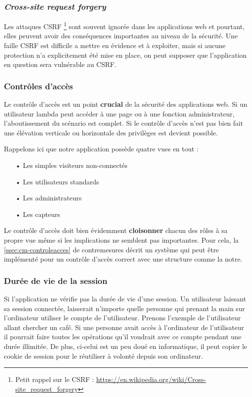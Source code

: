 \documentclass[12pt]{article}
\begin{document}
\subsubsection{\emph{Cross-site request forgery}}

Les attaques CSRF \footnote{Petit rappel sur le CSRF : \url{https://en.wikipedia.org/wiki/Cross-site_request_forgery}} sont souvent ignorée dans les applications web et pourtant, elles peuvent avoir des conséquences importantes au niveau de la sécurité. Une faille CSRF est difficile a
mettre en évidence et à exploiter, mais si aucune protection n'a explicitement été mise en place, on peut supposer que l'application en question sera vulnérable au CSRF.

\subsubsection{Contrôles d'accès}

Le contrôle d'accès est un point \textbf{crucial} de la sécurité des applications web. Si un utilisateur lambda peut accéder à une page ou à une fonction administrateur, l'aboutissement du scénario est complet. Si le contrôle d'accès n'est pas bien fait une élévation verticale ou horizontale des privilèges est devient possible. 

Rappelons ici que notre application possède quatre vues en tout :

\begin{itemize}
\item[•] Les simples visiteurs non-connectés
\item[•] Les utilisateurs standards
\item[•] Les administrateurs
\item[•] Les capteurs
\end{itemize}

Le contrôle d'accès doit bien évidemment \textbf{cloisonner} chacun des rôles à sa propre vue même si les implications ne semblent pas importantes. Pour cela, la \autoref{ssec:cm-controleacces} de contremesures décrit un système qui peut être implémenté pour un contrôle d'accès correct avec une structure comme la notre.

\subsubsection{Durée de vie de la session}

Si l'application ne vérifie pas la durée de vie d'une session. Un utilisateur laissant sa session connectée, laisserait n'importe quelle personne qui prenant la main sur l'ordinateur utiliser le compte de l'utilisateur.
Prenons l'exemple de l'utilisateur allant chercher un café. Si une personne avait accès à l'ordinateur de l'utilisateur il pourrait faire toutes les opérations qu'il voudrait avec ce compte pendant une durée illimitée. De plus, ci-celui est un peu doué en informatique, il peut copier le cookie de session pour le réutiliser à volonté depuis son ordinateur.
\end{document}
